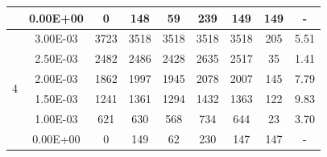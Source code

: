 \begin{table}[H]
{\begin{tabular}{|c|c|c|c|c|c|c|c|c|}
                               & 0.00E+00         & 0         & 148                                                        & 59                                                        & 239                                                       & 149     & 149    & -                                                                  \\ \hline
            \multirow{6}{*}{4} & 3.00E-03         & 3723      & 3518                                                       & 3518                                                      & 3518                                                      & 3518    & 205    & 5.51                                                               \\ \cline{2-9}
                               & 2.50E-03         & 2482      & 2486                                                       & 2428                                                      & 2635                                                      & 2517    & 35     & 1.41                                                               \\ \cline{2-9}
                               & 2.00E-03         & 1862      & 1997                                                       & 1945                                                      & 2078                                                      & 2007    & 145    & 7.79                                                               \\ \cline{2-9}
                               & 1.50E-03         & 1241      & 1361                                                       & 1294                                                      & 1432                                                      & 1363    & 122    & 9.83                                                               \\ \cline{2-9}
                               & 1.00E-03         & 621       & 630                                                        & 568                                                       & 734                                                       & 644     & 23     & 3.70                                                               \\ \cline{2-9}
                               & 0.00E+00         & 0         & 149                                                        & 62                                                        & 230                                                       & 147     & 147    & -                                                                  \\ \hline

\end{tabular}}
\end{table}
